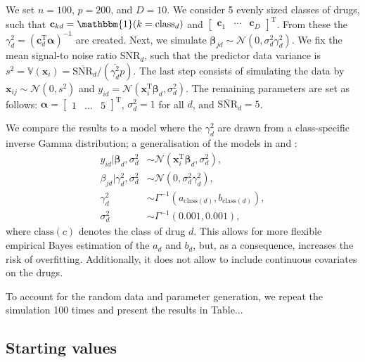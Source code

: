 \documentclass[a4paper,hidelinks]{article}\usepackage[]{graphicx}\usepackage[]{color}
\newcommand{\x}{\mathbf{x}}
\newcommand{\0}{\bm{0}}
\newcommand{\V}{\mathbb{V}}
\newcommand{\tr}{^{\text{T}}}
\renewcommand{\(}{\left(}
\renewcommand{\)}{\right)}
\renewcommand{\[}{\left[}
\renewcommand{\]}{\right]}
\begin{document}
\begin{appendix}
		We set $n=100$, $p=200$, and $D=10$. We consider 5 evenly sized classes of drugs, such that $\mathbf{c}_{kd} = \mathbbm{1}(k = \text{class}_d)$ and $\begin{bmatrix} \mathbf{c}_1 & \cdots & \mathbf{c}_D \end{bmatrix} \tr$. From these the $\gamma_d^2 = (\mathbf{c}_d \tr \bm{\alpha})^{-1}$ are created. Next, we simulate $\bm{\beta}_{jd} \sim \mathcal{N} (0, \sigma^2_d \gamma_d^2)$. We fix the mean signal-to noise ratio $\overline{\text{SNR}}_d$, such that the predictor data variance is $s^2 = \V(\mathbf{x}_i) = \overline{\text{SNR}}_d / (\overline{\gamma^2_d} p)$. The last step consists of simulating the data by $\mathbf{x}_{ij} \sim \mathcal{N}(0,s^2)$ and $y_{id} = \mathcal{N} (\mathbf{x}_i \tr \bm{\beta}_d, \sigma_d^2)$. The remaining parameters are set as follows: $\bm{\alpha} = \begin{bmatrix} 1 & \dots & 5 \end{bmatrix} \tr$, $\sigma_d^2 = 1$ for all $d$, and $\overline{\text{SNR}}_d = 5$.
		
		We compare the results to a model where the $\gamma_d^2$ are drawn from a class-specific  inverse Gamma distribution; a generalisation of the models in \cite{kpogbezan_empirical_2017} and \cite{leday_gene_2017}:
		\begin{align*}
		y_{id} | \bm{\beta}_d ,\sigma_d^2 & \sim \mathcal{N} (\x_i \tr \bm{\beta}_d, \sigma_d^2), \\
		\beta_{jd} | \gamma_d^2 ,\sigma_d^2 & \sim \mathcal{N} (0, \sigma_d^2 \gamma_d^2), \\
		\gamma_d^2 & \sim \Gamma^{-1} (a_{\text{class}(d)}, b_{\text{class}(d)}), \\
		\sigma_d^2 & \sim \Gamma^{-1} (0.001, 0.001),
		\end{align*}
		where $\text{class}(c)$ denotes the class of drug $d$. This allows for more flexible empirical Bayes estimation of the $a_d$ and $b_d$, but, as a consequence, increases the risk of overfitting. Additionally, it does not allow to include continuous covariates on the drugs.
		
		To account for the random data and parameter generation, we repeat the simulation 100 times and present the results in Table...
		
		\subsection{Starting values}


\end{appendix}
\end{document}

